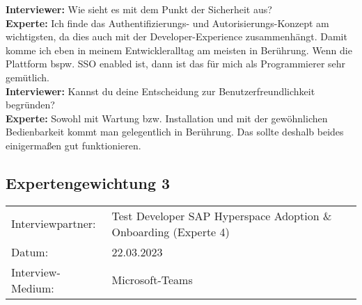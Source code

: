 \begin{linenumbers}
    \textbf{Interviewer:} Wie sieht es mit dem Punkt der Sicherheit aus?\\
    \textbf{Experte:} Ich finde das Authentifizierungs- und Autorisierungs-Konzept am wichtigsten, da dies auch mit der Developer-Experience zusammenhängt. Damit komme ich eben in meinem Entwickleralltag am meisten in Berührung. Wenn die Plattform bspw. SSO enabled ist, dann ist das für mich als Programmierer sehr gemütlich.\\ 
    \textbf{Interviewer:} Kannst du deine Entscheidung zur Benutzerfreundlichkeit begründen?\\
    \textbf{Experte:} Sowohl mit Wartung bzw. Installation und mit der gewöhnlichen Bedienbarkeit kommt man gelegentlich in Berührung. Das sollte deshalb beides einigermaßen gut funktionieren.\\
\end{linenumbers}

\newpage
\subsection{Expertengewichtung 3}
        \begin{tabular}{ l l }
    Interviewpartner: & Test Developer SAP Hyperspace Adoption \& Onboarding (Experte 4)\\
    Datum: & 22.03.2023\\
    Interview-Medium: & Microsoft-Teams\\
\end{tabular}
\begin{center}
\begin{figure}[H]
    \centering
    \label{fig:CEA}
\end{figure}	
\end{center}
\begin{center}
\begin{figure}[H]
    \centering
    \label{fig:CEA}
\end{figure}	
\end{center}

